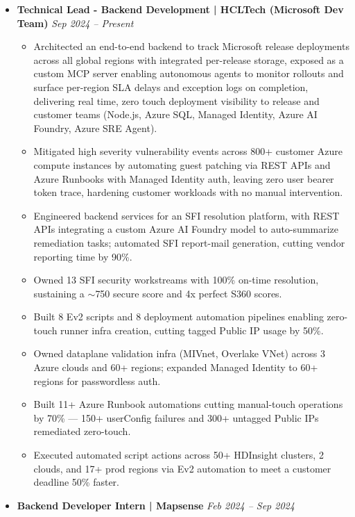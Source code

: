 \documentclass[a4paper,10pt]{article}
\begin{document}
\begin{itemize}[leftmargin=0pt, label={}]
    \item \textbf{Technical Lead - Backend Development | HCLTech (Microsoft Dev Team)} \hfill \textit{Sep 2024 -- Present}
  \vspace{1pt}
  \begin{itemize}[leftmargin=*]
    \item Architected an end-to-end backend to track Microsoft release deployments across all global regions with integrated per-release storage, exposed as a custom MCP server enabling autonomous agents to monitor rollouts and surface per-region SLA delays and exception logs on completion, delivering real time, zero touch deployment visibility to release and customer teams (Node.js, Azure SQL, Managed Identity, Azure AI Foundry, Azure SRE Agent).
    \item Mitigated high severity vulnerability events across 800+ customer Azure compute instances by automating guest patching via REST APIs and Azure Runbooks with Managed Identity auth, leaving zero user bearer token trace, hardening customer workloads with no manual intervention.
    \item Engineered backend services for an SFI resolution platform, with REST APIs integrating a custom Azure AI Foundry model to auto-summarize remediation tasks; automated SFI report-mail generation, cutting vendor reporting time by 90\%.
    \item Owned 13 SFI security workstreams with 100\% on-time resolution, sustaining a $\sim$750 secure score and 4x perfect S360 scores.
    \item Built 8 Ev2 scripts and 8 deployment automation pipelines enabling zero-touch runner infra creation, cutting tagged Public IP usage by 50\%.
    \item Owned dataplane validation infra (MIVnet, Overlake VNet) across 3 Azure clouds and 60+ regions; expanded Managed Identity to 60+ regions for passwordless auth.
    \item Built 11+ Azure Runbook automations cutting manual-touch operations by 70\% --- 150+ userConfig failures and 300+ untagged Public IPs remediated zero-touch.
    \item Executed automated script actions across 50+ HDInsight clusters, 2 clouds, and 17+ prod regions via Ev2 automation to meet a customer deadline 50\% faster.
  \end{itemize}
  \vspace{8pt}
  \item \textbf{Backend Developer Intern | Mapsense} \hfill \textit{Feb 2024 -- Sep 2024}

\end{itemize}
\end{document}
